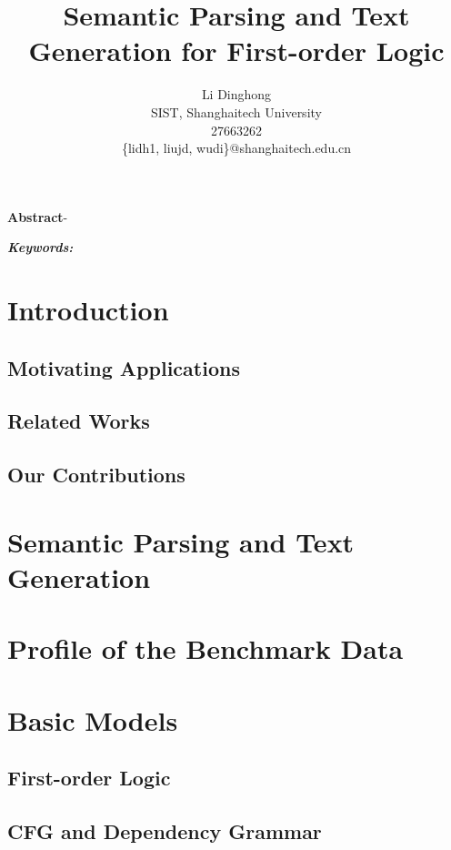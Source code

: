 \documentclass{article}
\title{Semantic Parsing and Text Generation for First-order Logic}
\author{
	Li Dinghong\\
	SIST, Shanghaitech University\\
	27663262\\
	\{lidh1, liujd, wudi\}@shanghaitech.edu.cn
}
\begin{document}
{
	\newpage
	\maketitle

	\textbf{Abstract}-{}

	\vspace{5pt}
	\textbf{\emph{Keywords:}} {}

	\tableofcontents
}

\section{Introduction}{
	\subsection{Motivating Applications}{
		\cite{su} 
	}

	\subsection{Related Works}{}

	\subsection{Our Contributions}{}
}

\section{Semantic Parsing and Text Generation}{}

\section{Profile of the Benchmark Data}{}

\section{Basic Models}{
	\subsection{First-order Logic}{}

	\subsection{CFG and Dependency Grammar}{}
}
\end{document}
